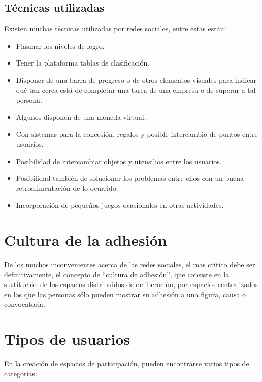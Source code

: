 \subsection{Técnicas utilizadas}

Existen muchas técnicas utilizadas por redes sociales, entre estas están:

\begin{itemize}
\item Plasmar los niveles de logro.
\item Tener la plataforma tablas de clasificación.
\item Disponer de una barra de progreso o de otros elementos visuales para
      indicar qué tan cerca está de completar una tarea de una empresa o de
      superar a tal persona.
\item Algunos disponen de una moneda virtual.
\item Con sistemas para la concesión, regalos y posible intercambio de puntos
      entre usuarios.
\item Posibilidad de intercambiar objetos y utensilios entre los usuarios.
\item Posibilidad también de solucionar los problemas entre ellos con un buena
      retroalimentación de lo ocurrido.
\item Incorporación de pequeños juegos ocasionales en otras actividades.
\end{itemize}

\section{Cultura de la adhesión}

De los muchos inconvenientes acerca de las redes sociales, el mas critico debe
ser definitivamente, el concepto de “cultura de adhesión”, que consiste en la
sustitución de los espacios distribuidos de deliberación, por espacios
centralizados en los que las personas sólo pueden mostrar su adhesión a una
figura, causa o convocatoria.\cite{LasIndias}

\section{Tipos de usuarios}

En la creación de espacios de participación, pueden encontrarse varios tipos de
categorías:\cite{Santamaria2}

